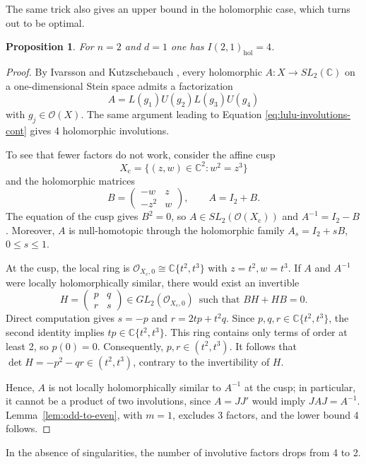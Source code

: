 \documentclass{amsart}
\newcommand{\C}{\mathbb{C}}
\newcommand{\Ocal}{\mathcal O}
\newcommand{\hol}{\mathrm{hol}}
\newtheorem{proposition}[theorem]{Proposition}
\theoremstyle{definition}
\begin{document}
The same trick also gives an upper bound in the holomorphic case, which turns out to be optimal.

\begin{proposition}\label{prop:singular-holomorphic}
For $n=2$ and $d=1$ one has $I(2,1)_{\hol}=4$.
\end{proposition}

\begin{proof}
By Ivarsson and Kutzschebauch \cite[Theorem~5.1]{IKnumber}, every holomorphic
$A: X\to SL_2(\C)$ on a one-dimensional Stein space admits a factorization
\[
 A=L(g_1)U(g_2)L(g_3)U(g_4)
\]
with $g_j\in\Ocal(X)$. The same argument leading to Equation
\eqref{eq:lulu-involutions-cont} gives 4 holomorphic involutions.

To see that fewer factors do not work, consider the affine cusp
\[
 X_{\mathrm c}=\{(z,w)\in\C^2:w^2=z^3\}
\]
and the holomorphic matrices
\[
 B=\begin{pmatrix}-w&z\\-z^2&w\end{pmatrix},
 \qquad A=I_2+B.
\]
The equation of the cusp gives $B^2=0$, so $A\in SL_2(\Ocal(X_{\mathrm c}))$
and $A^{-1}=I_2-B$.  Moreover, $A$ is null-homotopic through the holomorphic
family $A_s=I_2+sB$, $0\leq s\leq1$.

At the cusp, the local ring is $\Ocal_{X_{\mathrm c},0}\cong\C\{t^2,t^3\}$ with $z=t^2, w=t^3$. 
If $A$ and $A^{-1}$ were locally holomorphically similar, there would exist an
invertible
\[
 H=\begin{pmatrix}p&q\\r&s\end{pmatrix}\in GL_2(\Ocal_{X_{\mathrm c},0}) \, \text{ such that } BH+HB=0.
\]
Direct computation gives $s=-p$ and $r=2tp+t^2q$.
Since $p,q,r\in\C\{t^2,t^3\}$, the second identity implies
$tp\in\C\{t^2,t^3\}$.  This ring contains only terms of order at least 2, so
$p(0)=0$. Consequently, $p,r\in (t^2,t^3)$.  It follows that $\det H=-p^2-qr\in (t^2,t^3)$, 
contrary to the invertibility of $H$.  

Hence, $A$ is not locally
holomorphically similar to $A^{-1}$ at the cusp;
in particular, it cannot be a
product of two involutions, since $A=J J'$ would imply $JAJ=A^{-1}$.
Lemma~\ref{lem:odd-to-even}, with $m=1$, excludes 3 factors, and the lower
bound 4 follows.
\end{proof}

In the absence of singularities, the number of involutive factors drops from 4 to 2. 
\end{document}
